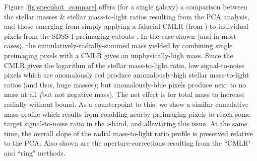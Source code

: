 Figure \ref{fig:specphot_compare} offers (for a single galaxy) a comparison between the stellar masses \& stellar mass-to-light ratios resulting from the PCA analysis, and those emerging from simply applying a fiducial CMLR (from ) to individual pixels from the SDSS-I preimaging cutouts \citep{sdss_summary}. In the case shown (and in most cases), the cumulatively-radially-summed mass yielded by combining single preimaging pixels with a CMLR gives an unphysically-high mass. Since the CMLR gives the logarithm of the stellar mass-to-light ratio, low signal-to-noise pixels which are anomalously red produce anomalously-high stellar mass-to-light ratios (and thus, huge masses); but anomalously-blue pixels produce next to no mass at all \emph(but not negative mass). The net effect is for total mass to increase radially without bound. As a counterpoint to this, we show a similar cumulative mass profile which results from coadding nearby preimaging pixels to reach some target signal-to-noise ratio in the $i$-band, and alleviating this issue. At the same time, the overall slope of the radial mass-to-light ratio profile is preserved relative to the PCA. Also shown are the aperture-corrections resulting from the ``CMLR" and ``ring" methods.

